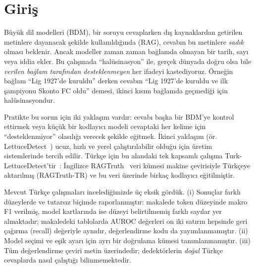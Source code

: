 \documentclass[conference,a4paper]{IEEEtran}
\begin{document}
\section{Giriş}

Büyük dil modelleri (BDM), bir soruyu cevaplarken dış kaynaklardan getirilen metinlere dayanacak şekilde kullanıldığında (RAG), cevabın bu metinlere \emph{sadık} olması beklenir. Ancak modeller zaman zaman bağlamda olmayan bir tarih, sayı veya iddia ekler. Bu çalışmada ``halüsinasyon'' ile, gerçek dünyada doğru olsa bile \emph{verilen bağlam tarafından desteklenmeyen} her ifadeyi kastediyoruz. Örneğin bağlam ``Lig 1927'de kuruldu'' derken cevabın ``Lig 1927'de kuruldu ve ilk şampiyonu Skonto FC oldu'' demesi, ikinci kısım bağlamda geçmediği için halüsinasyondur.

Pratikte bu sorun için iki yaklaşım vardır: cevabı başka bir BDM'ye kontrol ettirmek veya küçük bir kodlayıcı modeli cevaptaki her kelime için ``desteklenmiyor'' olasılığı verecek şekilde eğitmek. İkinci yaklaşım (ör. LettuceDetect~\cite{kovacs2025lettucedetect}) ucuz, hızlı ve yerel çalıştırılabilir olduğu için üretim sistemlerinde tercih edilir. Türkçe için bu alandaki tek kapsamlı çalışma Turk-LettuceDetect'tir~\cite{tas2025turk}: İngilizce RAGTruth~\cite{niu2024ragtruth} veri kümesi makine çevirisiyle Türkçeye aktarılmış (RAGTruth-TR) ve bu veri üzerinde birkaç kodlayıcı eğitilmiştir.

Mevcut Türkçe çalışmaları incelediğimizde üç eksik gördük. (i) Sonuçlar farklı düzeylerde ve tutarsız biçimde raporlanmıştır: makalede token düzeyinde makro F1 verilmiş, model kartlarında ise düzeyi belirtilmemiş farklı sayılar yer almaktadır; makaledeki tablolarda AUROC değerleri on iki satırın hepsinde geri çağırma (recall) değeriyle aynıdır, değerlendirme kodu da yayımlanmamıştır. (ii) Model seçimi ve eşik ayarı için ayrı bir doğrulama kümesi tanımlanmamıştır. (iii) Tüm değerlendirme çeviri metin üzerindedir; dedektörlerin \emph{doğal} Türkçe cevaplarda nasıl çalıştığı bilinmemektedir.
\end{document}
